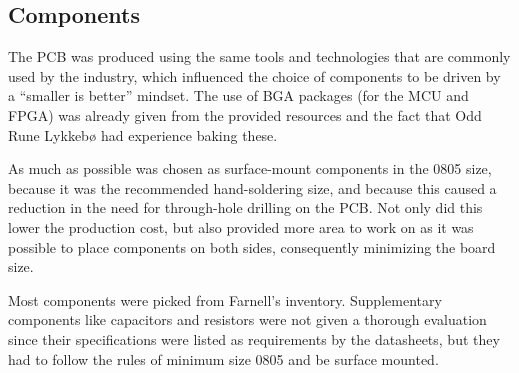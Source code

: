 
\subsection{Components}

The PCB was produced using the same tools and technologies that are commonly
used by the industry, which influenced the choice of components to be driven by
a ``smaller is better'' mindset. The use of BGA packages (for the MCU and FPGA)
was already given from the provided resources and the fact that Odd Rune Lykkebø
had experience baking these.

As much as possible was chosen as surface-mount components in
the 0805 size, because it was the recommended hand-soldering
size, and because this caused a reduction in the need for
through-hole drilling on the PCB. Not only did this lower the production cost,
but also provided more area to work on as it was possible to place components on
both sides, consequently minimizing the board size.

Most components were picked from Farnell's inventory. Supplementary components
like capacitors and resistors were not given a thorough evaluation since their
specifications were listed as requirements by the datasheets, but they had to
follow the rules of minimum size 0805 and be surface mounted.







